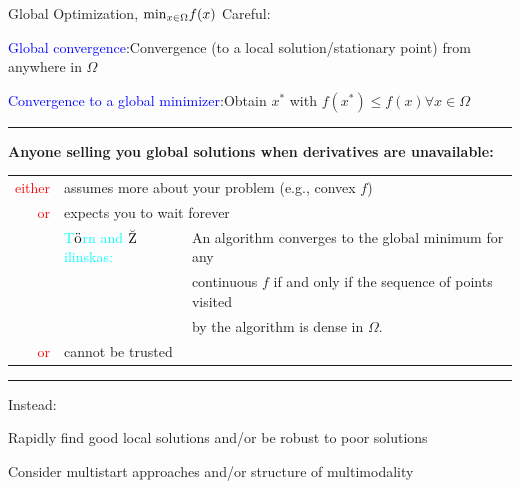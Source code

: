 \documentclass[handout,aspectratio=54]{beamer}
\numberwithin{theorem}{section}
\begin{document}
\begin{frame}{Global Optimization, $\textup{min}_{x\in\Omega} f(x)$}
Careful:
\begin{itemize}
\small{
\item \textcolor{blue}{Global convergence}:Convergence (to a local solution/stationary point) from anywhere in $\Omega$
\item \textcolor{blue}{Convergence to a global minimizer}:Obtain $x^*$ with $f(x^*)\le f(x)\forall x\in\Omega$
}
\end{itemize}

\rule{\textwidth}{1pt}
\footnotesize{
\textbf{Anyone selling you global solutions when derivatives are unavailable:}
}
\begin{table}[]\scriptsize
\begin{tabular}{rll}
\textcolor{red}{either}   & \multicolumn{2}{l}{assumes more about your problem (e.g., convex $f$)}\\
\textcolor{red}{or} & \multicolumn{2}{l}{expects you to wait forever} \\
 & \textcolor{cyan}{T$\ddot{\textup{o}}$rn and $\breve{\textup{Z}}$ilinskas:} & An algorithm converges to the global minimum for any \\
         &                      & continuous $f$ if and only if the sequence of points visited  \\
   &            & by the algorithm is dense in $\Omega$.\\
\textcolor{red}{or} & \multicolumn{2}{l}{cannot be trusted}          
\end{tabular}
\end{table}

\rule{\textwidth}{1pt}
Instead:
\begin{itemize}
\small{
\item Rapidly find good local solutions and/or be robust to poor solutions
\item Consider multistart approaches and/or structure of multimodality
}
\end{itemize}
\end{frame}
\end{document}
